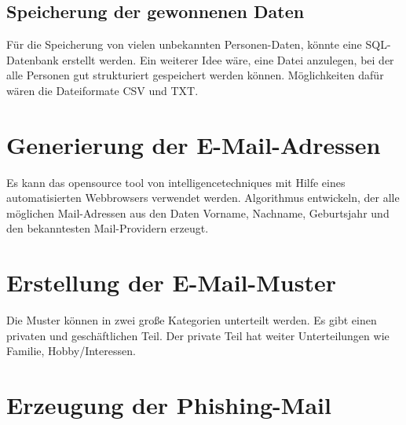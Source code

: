 	\subsection{Speicherung der gewonnenen Daten}
	Für die Speicherung von vielen unbekannten Personen-Daten, könnte eine SQL-Datenbank erstellt werden. Ein weiterer Idee wäre, eine Datei anzulegen, bei der alle Personen gut strukturiert gespeichert werden können. Möglichkeiten dafür wären die Dateiformate CSV und TXT.%

\section{Generierung der E-Mail-Adressen}
Es kann das opensource tool von intelligencetechniques mit Hilfe eines automatisierten Webbrowsers verwendet werden. Algorithmus entwickeln, der alle möglichen Mail-Adressen aus den Daten Vorname, Nachname, Geburtsjahr und den bekanntesten Mail-Providern erzeugt.

\section{Erstellung der E-Mail-Muster}
Die Muster können in zwei große Kategorien unterteilt werden. Es gibt einen privaten und geschäftlichen Teil. Der private Teil hat weiter Unterteilungen wie Familie, Hobby/Interessen.
\section{Erzeugung der Phishing-Mail}
